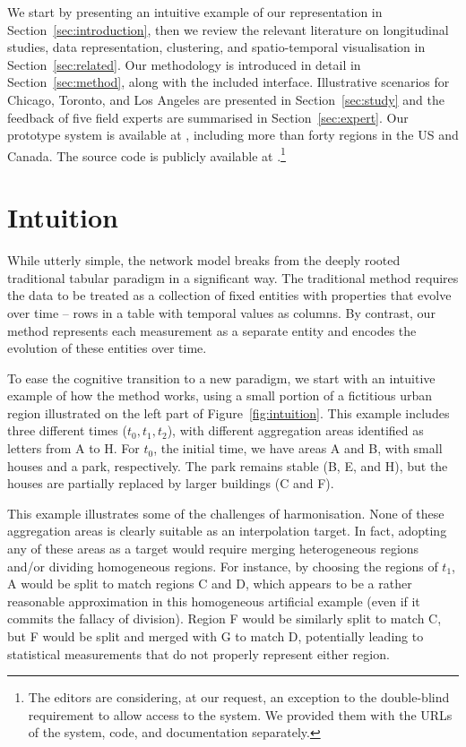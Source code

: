 We start by presenting an intuitive example of our representation in
Section~\ref{sec:introduction}, then we review the relevant literature on
longitudinal studies, data representation, clustering, and spatio-temporal
visualisation in Section~\ref{sec:related}. Our methodology is introduced in
detail in Section~\ref{sec:method}, along with the included interface.
Illustrative scenarios for Chicago, Toronto, and Los Angeles are presented in
Section~\ref{sec:study} and the feedback of five field experts are summarised in
Section~\ref{sec:expert}. Our prototype system is available at
, including more than forty regions in the
US and Canada. The source code is publicly available at
.\footnote{The editors are
considering, at our request, an exception to the double-blind requirement to
allow access to the system. We provided them with the URLs of the system, code,
and documentation separately.}


\section{Intuition}
\label{sec:intuition}
While utterly simple, the network model breaks from the deeply rooted
traditional tabular paradigm in a significant way. The traditional method
requires the data to be treated as a collection of fixed entities with
properties that evolve over time -- rows in a table with temporal values as
columns. By contrast, our method represents each measurement as a separate
entity and encodes the evolution of these entities over time.

To ease the cognitive transition to a new paradigm, we start with an intuitive
example of how the method works, using a small portion of a fictitious urban
region illustrated on the left part of Figure~\ref{fig:intuition}. This example
includes three different times ($t_0,t_1,t_2$), with different aggregation areas
identified as letters from A to H. For $t_0$, the initial time, we have areas A
and B, with small houses and a park, respectively. The park remains stable (B,
E, and H), but the houses are partially replaced by larger buildings (C and F). 

This example illustrates some of the challenges of harmonisation. None of these
aggregation areas is clearly suitable as an interpolation target. In fact,
adopting any of these areas as a target would require merging heterogeneous
regions and/or dividing homogeneous regions. For instance, by choosing the
regions of $t_1$, A would be split to match regions C and D, which appears to be
a rather reasonable approximation in this homogeneous artificial example (even
if it commits the fallacy of division). Region F would be similarly split to
match C, but F would be split and merged with G to match D, potentially leading
to statistical measurements that do not properly represent either region. 

